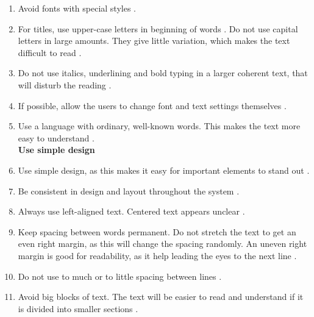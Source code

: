 \begin{enumerate}[{g}.1]
\item Avoid fonts with special styles \cite{blindeforbundetTekst} \cite{actionforblindpeopleTekst}.
\item For titles, use upper-case letters in beginning of words \cite{actionforblindpeopleTekst}. Do not use capital letters in large amounts. They give little variation, which makes the text difficult to read \cite{blindeforbundetTekst}. 
\item Do not use italics, underlining and bold typing in a larger coherent text, that will disturb the reading \cite{blindeforbundetTekst} \cite{actionforblindpeopleTekst}.  
\item If possible, allow the users to change font and text settings themselves \cite{blindeforbundetTekst} \cite{w3cTekst}. 
\item Use a language with ordinary, well-known words. This makes the text more easy to understand \cite{w3cTekst}. \\ 


\textbf{Use simple design}

\item Use simple design, as this makes it easy for important elements to stand out \cite{actionforblindpeopleTekst}.
\item Be consistent in design and layout throughout the system \cite{actionforblindpeopleTekst}.
\item Always use left-aligned text. Centered text appears unclear \cite{actionforblindpeopleTekst}.  
\item Keep spacing between words permanent. Do not stretch the text to get an even right margin, as this will change the spacing randomly. An uneven right margin is good for readability, as it help leading the eyes to the next line \cite{blindeforbundetTekst} \cite{actionforblindpeopleTekst}.
\item Do not use to much or to little spacing between lines \cite{blindeforbundetTekst} \cite{actionforblindpeopleTekst}. 
\item Avoid big blocks of text. The text will be easier to read and understand if it is divided into smaller sections \cite{blindeforbundetTekst} \cite{actionforblindpeopleTekst} \cite{evengrounds}. \\  



\end{enumerate}

